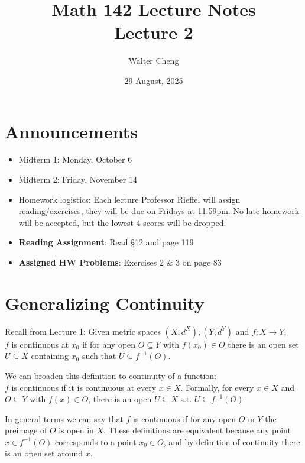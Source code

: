 \documentclass[11pt]{article}
\title{Math 142 Lecture Notes\\ Lecture 2}
\date{29 August, 2025}
\author{Walter Cheng}
\begin{document}
\maketitle

\section{Announcements}
\begin{itemize}
	\item Midterm 1: Monday, October 6
	\item Midterm 2: Friday, November 14
	\item Homework logistics: Each lecture Professor Rieffel will assign reading/exercises, they will be due on Fridays at 11:59pm. No late homework will be accepted, but the lowest 4 scores will be dropped.
	\item \textbf{Reading Assignment}: Read \S 12 and page 119
	\item \textbf{Assigned HW Problems}: Exercises 2 \& 3 on page 83 
\end{itemize}

\section{Generalizing Continuity}
Recall from Lecture 1: Given metric spaces $(X, d^X), (Y, d^Y)$ and $f\colon X \to Y$,\\
 $f$ is continuous at $x_0$ if for any open $O \subseteq Y$ with $f(x_0) \in O$ there is an open set $U \subseteq X$ containing $x_0$ such that $U \subseteq f^{-1}(O)$. 

We can broaden this definition to continuity of a function:\\
 $f$ is continuous if it is continuous at every $x \in X$. Formally, for every $x \in X$ and $O \subseteq Y$ with $f(x) \in O$, there is an open $U \subseteq X$ s.t. $U \subseteq f^{-1}(O)$.

In general terms we can say that $f$ is continuous if for any open $O$ in $Y$ the preimage of $O$ is open in $X$. These definitions are equivalent because any point $x \in f^{-1}(O)$ corresponds to a point $x_0 \in O$, and by definition of continuity there is an open set around $x$.
\end{document}

